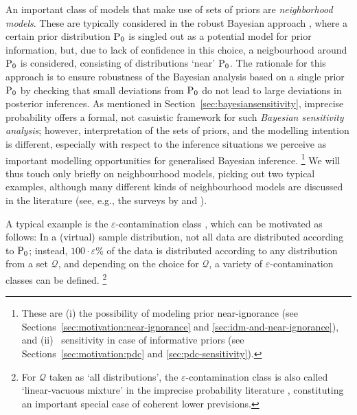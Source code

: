 An important class of models that make use of sets of priors are \emph{neighborhood models}.
These are typically considered in the robust Bayesian approach \parencite[see, e.g.,][]{1994:berger,2000:rios},
where a certain prior distribution $\operatorname{P}_0$ is singled out as a potential model for prior information,
but, due to lack of confidence in this choice, a neigbourhood around $\operatorname{P}_0$ is considered,
consisting of distributions `near' $\operatorname{P}_0$.
The rationale for this approach is to ensure robustness of the Bayesian analysis based on a single prior $\operatorname{P}_0$
by checking that small deviations from $\operatorname{P}_0$ do not lead to large deviations in posterior inferences.
As mentioned in Section~\ref{sec:bayesiansensitivity},
imprecise probability offers a formal, not casuistic framework for such \emph{Bayesian sensitivity analysis};
however, interpretation of the sets of priors, and the modelling intention is different,
especially with respect to the inference situations we perceive as important modelling opportunities
for generalised Bayesian inference.%
\footnote{These are (i) the possibility of modeling prior near-ignorance
(see Sections~\ref{sec:motivation:near-ignorance} and \ref{sec:idm-and-near-ignorance}),
and (ii) \pdc\ sensitivity in case of informative priors
(see Sections~\ref{sec:motivation:pdc} and \ref{sec:pdc-sensitivity}).}
We will thus touch only briefly on neighbourhood models,
picking out two typical examples,
although many different kinds of neighbourhood models are discussed in the literature
(see, e.g., the surveys by \textcite{2000:bergerinsuaruggeri} and \textcite{2005:ruggeri}).

A typical example is the $\varepsilon$-contamination class \parencite[see, e.g.,][\S 4.3.2]{1994:berger},
which can be motivated as follows:
In a (virtual) sample distribution,
not all data are distributed according to $\operatorname{P}_0$;
instead, %
$100\cdot\varepsilon$\% of the data is distributed according to any distribution from a set $\mathcal{Q}$, %
and depending on the choice for $\mathcal{Q}$, %
a variety of $\varepsilon$-contamination classes can be defined.%
\footnote{For $\mathcal{Q}$ taken as `all distributions',
the $\varepsilon$-contamination class is also called `linear-vacuous mixture'
in the imprecise probability literature \parencite[e.g.,][\S 7.3]{itip-special},
constituting an important special case of coherent lower previsions.}

